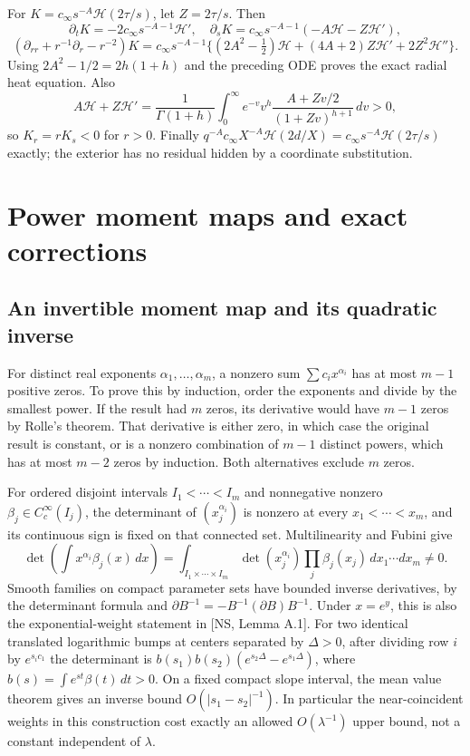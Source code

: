 \documentclass[10pt,a4paper]{article}
\begin{document}
For \(K=c_\infty s^{-A}\mathcal H(2\tau/s)\), let \(Z=2\tau/s\). Then
\[
\partial_tK=-2c_\infty s^{-A-1}\mathcal H',\quad
\partial_sK=c_\infty s^{-A-1}(-A\mathcal H-Z\mathcal H'),
\]
\[
(\partial_{rr}+r^{-1}\partial_r-r^{-2})K
=c_\infty s^{-A-1}\{(2A^2-\tfrac12)\mathcal H
+(4A+2)Z\mathcal H'+2Z^2\mathcal H''\}.
\]
Using \(2A^2-1/2=2h(1+h)\) and the preceding ODE proves the exact radial heat equation. Also
\[
A\mathcal H+Z\mathcal H'
=\frac1{\Gamma(1+h)}\int_0^\infty e^{-v}v^h
\frac{A+Zv/2}{(1+Zv)^{h+1}}\,dv>0,
\]
so \(K_r=rK_s<0\) for \(r>0\). Finally
\(q^{-A}c_\infty X^{-A}\mathcal H(2d/X)=c_\infty s^{-A}\mathcal H(2\tau/s)\) exactly; the exterior has no residual hidden by a coordinate substitution.



\section{Power moment maps and exact corrections}
\subsection{An invertible moment map and its quadratic inverse}
For distinct real exponents $\alpha_1,\ldots,\alpha_m$, a nonzero sum
$\sum c_ix^{\alpha_i}$ has at most $m-1$ positive zeros. To prove this by
induction, order the exponents and divide by the smallest power. If the result
had $m$ zeros, its derivative would have $m-1$ zeros by Rolle's theorem. That
derivative is either zero, in which case the original result is constant, or
is a nonzero combination of $m-1$ distinct powers, which has at most $m-2$
zeros by induction. Both alternatives exclude $m$ zeros.

For ordered disjoint intervals $I_1<\cdots<I_m$ and nonnegative nonzero
$\beta_j\in C_c^\infty(I_j)$, the determinant of $(x_j^{\alpha_i})$ is
nonzero at every $x_1<\cdots<x_m$, and its continuous sign is fixed on that
connected set. Multilinearity and Fubini give
\[
\det\left(\int x^{\alpha_i}\beta_j(x)\,dx\right)
=\int_{I_1\times\cdots\times I_m}\det(x_j^{\alpha_i})
 \prod_j\beta_j(x_j)\,dx_1\cdots dx_m\ne0.
\]
Smooth families on compact parameter sets have bounded inverse derivatives,
by the determinant formula and $\partial B^{-1}=-B^{-1}(\partial B)B^{-1}$.
Under $x=e^y$, this is also the exponential-weight statement in [NS, Lemma A.1].
For two identical translated logarithmic bumps at centers separated by
$\Delta>0$, after dividing row $i$ by $e^{s_ic_1}$ the determinant is
$b(s_1)b(s_2)(e^{s_2\Delta}-e^{s_1\Delta})$, where
$b(s)=\int e^{st}\beta(t)\,dt>0$. On a fixed compact slope interval,
the mean value theorem gives an inverse bound $O(|s_1-s_2|^{-1})$.
In particular the near-coincident weights in this construction cost exactly
an allowed $O(\lambda^{-1})$ upper bound, not a constant independent of $\lambda$.
\end{document}
